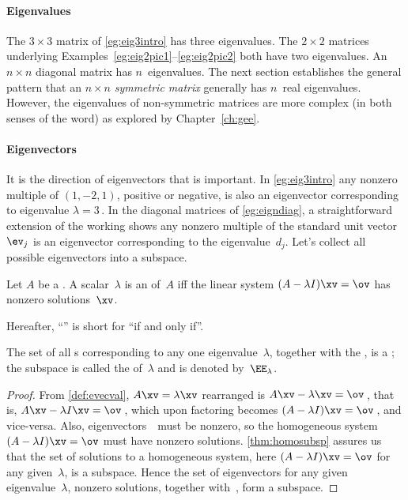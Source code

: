 \paragraph{Eigenvalues}
The \(3\times 3\) matrix of \autoref{eg:eig3intro} has three eigenvalues.
The \(2\times2\) matrices underlying Examples~\ref{eg:eig2pic1}--\ref{eg:eig2pic2} both have two eigenvalues.
An \(n\times n\) diagonal matrix has \(n\)~eigenvalues.
The next section establishes the general pattern that an \(n\times n\) \emph{symmetric matrix} generally has \(n\)~real eigenvalues.
However, the eigenvalues of non-symmetric matrices are more complex (in both senses of the word) as explored by Chapter~\ref{ch:gee}.

\paragraph{Eigenvectors}
It is the direction of eigenvectors that is important.
In \autoref{eg:eig3intro} any nonzero multiple of \((1,-2,1)\), positive or negative, is also an eigenvector corresponding to eigenvalue \(\lambda=3\)\,.
In the diagonal matrices of \autoref{eg:eigndiag}, a straightforward extension of the working shows any nonzero multiple of the standard unit vector~\(\ev_j\) is an eigenvector corresponding to the eigenvalue~\(d_j\).
Let's collect all possible eigenvectors into a subspace. 


\begin{theorem} \label{thm:espacedef} 
Let \(A\) be a . 
A scalar~\(\lambda\) is an  of~\(A\) iff the  linear system \((A-\lambda I)\xv=\ov\) has nonzero solutions~\(\xv\).  
\begin{aside}
Hereafter, ``'' is short for ``if and only if''.
\end{aside}%
The set of all s corresponding to any one eigenvalue~\(\lambda\), together with the , is a ; the subspace is called the  of~\(\lambda\) and is denoted by~\(\EE_\lambda\).
\end{theorem}



\begin{proof} 
From \autoref{def:evecval},  \(A\xv=\lambda\xv\)  rearranged is \(A\xv-\lambda\xv=\ov\)\,, that is, \(A\xv-\lambda I\xv=\ov\)\,, which upon factoring becomes \((A-\lambda I)\xv=\ov\)\,, and vice-versa.  
Also, eigenvectors~\xv\ must be nonzero, so the homogeneous system \((A-\lambda I)\xv=\ov\) must have nonzero solutions.
\autoref{thm:homosubsp} assures us that the set of solutions to a homogeneous system, here \((A-\lambda I)\xv=\ov\) for any given~\(\lambda\), is a subspace. 
Hence the set of eigenvectors for any given eigenvalue~\(\lambda\), nonzero solutions, together with~\ov, form a subspace.
\end{proof}


